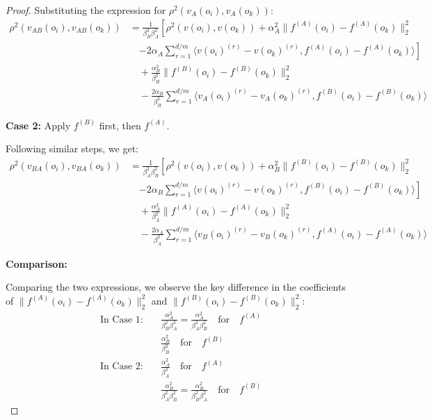 \documentclass[numbers,sort]{article}
\begin{document}
\begin{proof}
Substituting the expression for $\rho^2(v_A(o_i), v_A(o_k))$:
\begin{align}
\rho^2(v_{AB}(o_i), v_{AB}(o_k)) &= \frac{1}{\beta_B^2 \beta_A^2} \left[ \rho^2(v(o_i), v(o_k)) + \alpha_A^2 \|f^{(A)}(o_i) - f^{(A)}(o_k)\|_2^2 \right. \\
&\quad \left. - 2\alpha_A \sum_{r=1}^{d/m} \langle v(o_i)^{(r)} - v(o_k)^{(r)}, f^{(A)}(o_i) - f^{(A)}(o_k) \rangle \right] \\
&\quad + \frac{\alpha_B^2}{\beta_B^2} \|f^{(B)}(o_i) - f^{(B)}(o_k)\|_2^2 \\
&\quad - \frac{2\alpha_B}{\beta_B^2} \sum_{r=1}^{d/m} \langle v_A(o_i)^{(r)} - v_A(o_k)^{(r)}, f^{(B)}(o_i) - f^{(B)}(o_k) \rangle
\end{align}

\noindent\textbf{Case 2:} Apply $f^{(B)}$ first, then $f^{(A)}$.

Following similar steps, we get:
\begin{align}
\rho^2(v_{BA}(o_i), v_{BA}(o_k)) &= \frac{1}{\beta_A^2 \beta_B^2} \left[ \rho^2(v(o_i), v(o_k)) + \alpha_B^2 \|f^{(B)}(o_i) - f^{(B)}(o_k)\|_2^2 \right. \\
&\quad \left. - 2\alpha_B \sum_{r=1}^{d/m} \langle v(o_i)^{(r)} - v(o_k)^{(r)}, f^{(B)}(o_i) - f^{(B)}(o_k) \rangle \right] \\
&\quad + \frac{\alpha_A^2}{\beta_A^2} \|f^{(A)}(o_i) - f^{(A)}(o_k)\|_2^2 \\
&\quad - \frac{2\alpha_A}{\beta_A^2} \sum_{r=1}^{d/m} \langle v_B(o_i)^{(r)} - v_B(o_k)^{(r)}, f^{(A)}(o_i) - f^{(A)}(o_k) \rangle
\end{align}

\noindent\textbf{Comparison:} 

Comparing the two expressions, we observe the key difference in the coefficients of $\|f^{(A)}(o_i) - f^{(A)}(o_k)\|_2^2$ and $\|f^{(B)}(o_i) - f^{(B)}(o_k)\|_2^2$:
\begin{align}
\text{In Case 1:} &\quad \frac{\alpha_A^2}{\beta_B^2 \beta_A^2} = \frac{\alpha_A^2}{\beta_A^2 \beta_B^2} \quad \text{for} \quad f^{(A)} \\
&\quad \frac{\alpha_B^2}{\beta_B^2} \quad \text{for} \quad f^{(B)} \\
\text{In Case 2:} &\quad \frac{\alpha_A^2}{\beta_A^2} \quad \text{for} \quad f^{(A)} \\
&\quad \frac{\alpha_B^2}{\beta_A^2 \beta_B^2} = \frac{\alpha_B^2}{\beta_B^2 \beta_A^2} \quad \text{for} \quad f^{(B)}
\end{align}


\end{proof}
\end{document}
